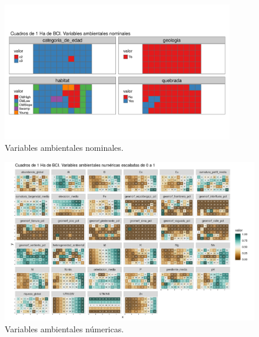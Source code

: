 \documentclass[11pt,]{article}
\begin{document}
\begin{figure}
\centering
\includegraphics[width=0.90000\textwidth]{mapas_variables_ambientales_nominales_tmap.png}
\caption{Variables ambientales nominales.\label{fig:ambvar}}
\end{figure}

\begin{figure}
\centering
\includegraphics[width=1.00000\textwidth]{mapas_variables_ambientales_numericas.png}
\caption{Variables ambientales númericas.\label{fig:varnum}}
\end{figure}
\end{document}
